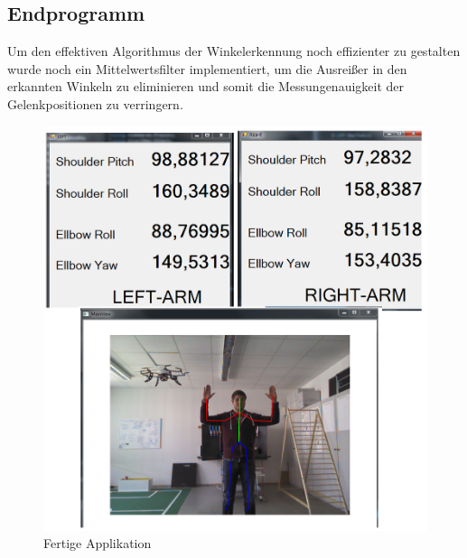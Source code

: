 \subsection{Endprogramm}
Um den effektiven Algorithmus der Winkelerkennung noch effizienter zu gestalten wurde noch ein Mittelwertsfilter implementiert, um die Ausreißer in den erkannten Winkeln zu eliminieren und somit die Messungenauigkeit der Gelenkpositionen zu verringern.

\begin{figure}[H]						
	\centering							
	\includegraphics[scale=0.4]{Bilder/Programm.png}
	\caption{Fertige Applikation}						
	\label{f:programm}						
\end{figure}


